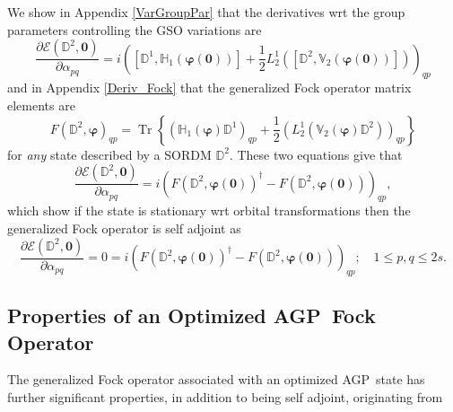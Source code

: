 \documentclass[aps,preprint]{revtex4}%
\begin{document}
We show in Appendix \ref{VarGroupPar} that the derivatives wrt the group
parameters controlling the GSO variations are
\begin{equation}
\frac{\partial\mathcal{E}\left(  \mathbb{D}^{2},\mathbf{0}\right)  }%
{\partial\alpha_{pq}}=i\left(  \left[  \mathbb{D}^{1},\mathbb{H}_{1}\left(
\mathbf{\varphi}\left(  \mathbf{0}\right)  \right)  \right]  +\frac{1}{2}%
L_{2}^{1}\left(  \left[  \mathbb{D}^{2},\mathbb{V}_{2}\left(  \mathbf{\varphi
}\left(  \mathbf{0}\right)  \right)  \right]  \right)  \right)  _{qp}%
\end{equation}
and in Appendix \ref{Deriv_Fock} that the generalized Fock operator matrix
elements are
\begin{equation}
F\left(  \mathbb{D}^{2},\mathbf{\varphi}\right)  _{qp}=\operatorname{Tr}%
\left\{  \left(  \mathbb{H}_{1}\left(  \mathbf{\varphi}\right)  \mathbb{D}%
^{1}\right)  _{qp}+\frac{1}{2}\left(  L_{2}^{1}\left(  \mathbb{V}_{2}\left(
\mathbf{\varphi}\right)  \mathbb{D}^{2}\right)  \right)  _{qp}\right\}
\end{equation}
for \emph{any} state described by a SORDM $\mathbb{D}^{2}$. These two
equations give that
\begin{equation}
\frac{\partial\mathcal{E}\left(  \mathbb{D}^{2},\mathbf{0}\right)  }%
{\partial\alpha_{pq}}=i\left(  F\left(  \mathbb{D}^{2},\mathbf{\varphi}\left(
\mathbf{0}\right)  \right)  ^{\dagger}-F\left(  \mathbb{D}^{2},\mathbf{\varphi
}\left(  \mathbf{0}\right)  \right)  \right)  _{qp},
\end{equation}
which show if the state is stationary wrt orbital transformations then the
generalized Fock operator is self adjoint as
\begin{equation}
\frac{\partial\mathcal{E}\left(  \mathbb{D}^{2},\mathbf{0}\right)  }%
{\partial\alpha_{pq}}=0=i\left(  F\left(  \mathbb{D}^{2},\mathbf{\varphi
}\left(  \mathbf{0}\right)  \right)  ^{\dagger}-F\left(  \mathbb{D}%
^{2},\mathbf{\varphi}\left(  \mathbf{0}\right)  \right)  \right)  _{qp}%
;\quad1\leq p,q\leq2s.
\end{equation}


\subsection{Properties of an Optimized AGP\ Fock Operator\label{AGP_Fock}}

The generalized Fock operator associated with an optimized AGP\ state has
further significant properties, in addition to being self adjoint, originating from
\end{document}
